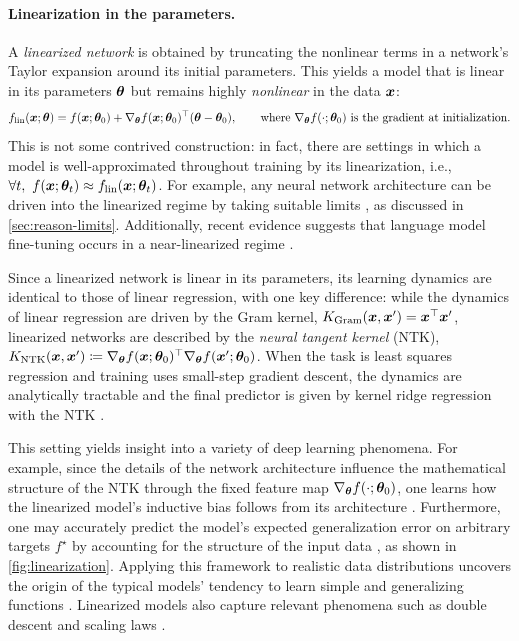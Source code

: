 \paragraph{Linearization in the parameters.}

A \textit{linearized network} is obtained by truncating the nonlinear terms in a network's Taylor expansion around its initial parameters. This yields a model that is linear in its parameters ${\bm{\theta}}$ but remains highly \emph{nonlinear} in the data ${\bm{x}}$:
\begin{equation}
    f_\text{lin}({\bm{x}};{\bm{\theta}}) = f({\bm{x}};{\bm{\theta}}_0) + \nabla_{{\bm{\theta}}} f({\bm{x}};{\bm{\theta}}_0)^\top ({\bm{\theta}}-{\bm{\theta}}_0),
    \qquad
    \text{where } \nabla_{{\bm{\theta}}} f(\cdot;{\bm{\theta}}_0)  \text{ is the gradient at initialization.}
\end{equation}
This is not some contrived construction: in fact, there are settings in which a model is well-approximated throughout training by its linearization, i.e., $\forall t,\  f({\bm{x}};{\bm{\theta}}_t)\approx f_\text{lin}({\bm{x}};{\bm{\theta}}_t)$.
For example, any neural network architecture can be driven into the linearized regime by taking suitable limits \citep{jacot2018neural,lee2019wide,chizat2019lazy,liu2020linearity}, as discussed in \cref{sec:reason-limits}.
Additionally, recent evidence suggests that language model fine-tuning occurs in a near-linearized regime \citep{malladi2023kernel,ren2025learning}.

Since a linearized network is linear in its parameters, its learning dynamics are identical to those of linear regression, with one key difference:
while the dynamics of linear regression are driven by the Gram kernel, $K_\text{Gram}({\bm{x}},{\bm{x}}')={\bm{x}}^\top{\bm{x}}'$, linearized networks are described by the \textit{neural tangent kernel} (NTK), $K_\text{NTK}({\bm{x}},{\bm{x}}')\coloneqq \nabla_{{\bm{\theta}}} f({\bm{x}};{\bm{\theta}}_0)^\top \nabla_{{\bm{\theta}}} f({\bm{x}}';{\bm{\theta}}_0)$.
When the task is least squares regression and training uses small-step gradient descent, the dynamics are analytically tractable and the final predictor is given by kernel ridge regression with the NTK \citep{jacot2018neural}.


This setting yields insight into a variety of deep learning phenomena.
For example, since the details of the network architecture influence the mathematical structure of the NTK through the fixed feature map $\nabla_{{\bm{\theta}}} f(\cdot;{\bm{\theta}}_0)$, one learns how the linearized model's inductive bias follows from its architecture \citep{arora2019exact,geifman2020similarity}.
Furthermore, one may accurately predict the model's expected generalization error on arbitrary targets $f^\star$ by accounting for the structure of the input data \citep{jacot:2020-KARE,canatar2021spectral,loureiro:2021-learning-curves,hastie:2022-surprises,wei2022more,simon2023eigenlearning}, as shown in \cref{fig:linearization}.
Applying this framework to realistic data distributions uncovers the origin of the typical models' tendency to learn simple and generalizing functions \citep{basri2020frequency,karkada2025predicting}.
Linearized models also capture relevant phenomena such as double descent \citep{belkin2019reconciling, advani2020high} and scaling laws \citep{caponnetto2007optimal,pillaud2018statistical, cui2023error, atanasov2024scaling}.

